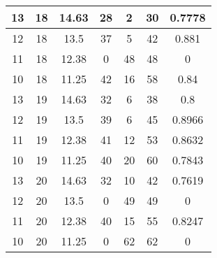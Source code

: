 \documentclass[letterpaper, 12pt]{article}
\begin{document}
\begin{longtable}{|c|c|c|c|c|c|c|}
\hline
13 & 18 & 14.63 & 28 & 2 & 30 & 0.7778 \\
\hline
12 & 18 & 13.5 & 37 & 5 & 42 & 0.881 \\
\hline
11 & 18 & 12.38 & 0 & 48 & 48 & 0 \\
\hline
10 & 18 & 11.25 & 42 & 16 & 58 & 0.84 \\
\hline
13 & 19 & 14.63 & 32 & 6 & 38 & 0.8 \\
\hline
12 & 19 & 13.5 & 39 & 6 & 45 & 0.8966 \\
\hline
11 & 19 & 12.38 & 41 & 12 & 53 & 0.8632 \\
\hline
10 & 19 & 11.25 & 40 & 20 & 60 & 0.7843 \\
\hline
13 & 20 & 14.63 & 32 & 10 & 42 & 0.7619 \\
\hline
12 & 20 & 13.5 & 0 & 49 & 49 & 0 \\
\hline
11 & 20 & 12.38 & 40 & 15 & 55 & 0.8247 \\
\hline
10 & 20 & 11.25 & 0 & 62 & 62 & 0 \\
\hline
\end{longtable}
\end{document}
